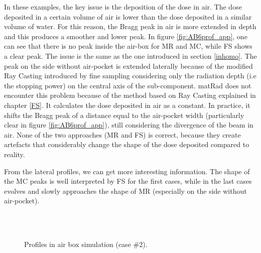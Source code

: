 \documentclass[12pt, a4paper, twoside]{book}
\begin{document}

In these examples, the key issue is the deposition of the dose in air. The dose deposited in a certain volume of air is lower than the dose deposited in a similar volume of water. For this reason, the Bragg peak in air is more extended in depth and this produces a smoother and lower peak. In figure \ref{fig:AB6prof_app}, one can see that there is no peak inside the air-box for MR and MC, while FS shows a clear peak. The issue is the same as the one introduced in section \ref{inhomo}. The peak on the side without air-pocket is extended laterally because of the modified Ray Casting introduced by fine sampling considering only the radiation depth (i.e the stopping power) on the central axis of the sub-component.
matRad does not encounter this problem because of the method based on Ray Casting explained in chapter \ref{FS}. It calculates the dose deposited in air as a constant. In practice, it shifts the Bragg peak of a distance equal to the air-pocket width (particularly clear in figure \ref{fig:AB6prof_app}), still considering the divergence of the beam in air.
None of the two approaches (MR and FS) is correct, because they create artefacts that considerably change the shape of the dose deposited compared to reality.

From the lateral profiles, we can get more interesting information. The shape of the MC peaks is well interpreted by FS for the first cases, while in the last cases evolves and slowly approaches the shape of MR (especially on the side without air-pocket).

\begin{figure}[!ht]
\centering
{} 
\\ 
\\
\caption{Profiles in air box simulation (case \#2).}
\label{fig:AB2prof}
\end{figure}
\end{document}
